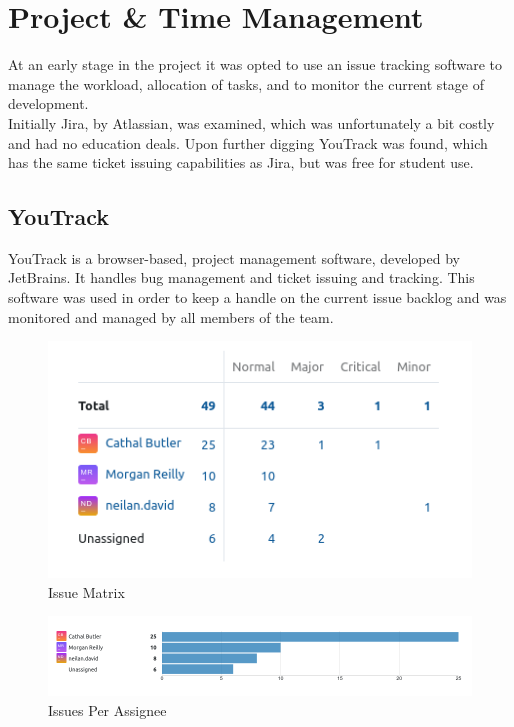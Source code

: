 \section{Project \& Time Management}
At an early stage in the project it was opted to use an issue tracking software to manage the workload, allocation of tasks, and to monitor the current stage of development.
\\ Initially Jira, by Atlassian, was examined, which was unfortunately a bit costly and had no education deals. Upon further digging YouTrack was found, which has the same ticket issuing capabilities as Jira, but was free for student use.
\subsection{YouTrack}
YouTrack is a browser-based, project management software, developed by JetBrains. It handles bug management and ticket issuing and tracking. This software was used in order to keep a handle on the current issue backlog and was monitored and managed by all members of the team. 

\begin{figure}[h!]
    \caption{Issue Matrix}
    \label{image:issuesMatrix}
    \centering
    \includegraphics[width=1.0\textwidth]{images/IssuesMatrix.png}
\end{figure}


\begin{figure}[h!]
    \caption{Issues Per Assignee}
    \label{image:IPA}
    \centering
    \includegraphics[width=1.0\textwidth]{images/IssuesPerAssignee.png}
\end{figure}


